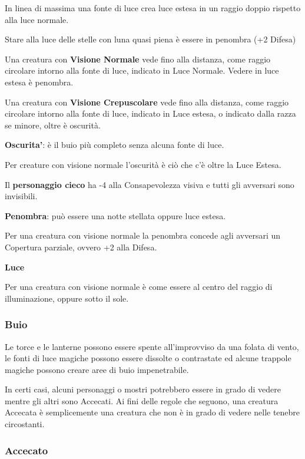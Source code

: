\documentclass[a4paper,11pt,twoside,openany]{book}
\begin{document}
\bigskip

In linea di massima una fonte di luce crea luce estesa in un raggio doppio rispetto alla luce normale.

Stare alla luce delle stelle con luna quasi piena è essere in penombra (+2 Difesa)

Una creatura con \textbf{Visione Normale} vede fino alla distanza, come raggio circolare intorno alla fonte di luce, indicato in Luce Normale. Vedere in luce estesa è penombra.

Una creatura con \textbf{Visione Crepuscolare} vede fino alla distanza, come raggio circolare intorno alla fonte di luce, indicato in Luce estesa, o indicato dalla razza se minore, oltre è oscurità.

\textbf{Oscurita'}: è il buio più completo senza alcuna fonte di luce.

Per creature con visione normale l'oscurità è ciò che c'è oltre la Luce Estesa.

Il \textbf{personaggio cieco} ha -4 alla Consapevolezza visiva e tutti gli avversari sono invisibili.

\textbf{Penombra}: può essere una notte stellata oppure luce estesa.

Per una creatura con visione normale la penombra concede agli avversari un Copertura parziale, ovvero +2 alla Difesa.

\textbf{Luce}

Per una creatura con visione normale è come essere al centro del raggio di illuminazione, oppure sotto il sole.

\subsubsection{Buio}

\label{buio}

Le torce e le lanterne possono essere spente all'improvviso da una folata di vento, le fonti di luce magiche possono essere dissolte o contrastate ed alcune trappole magiche possono creare aree di buio impenetrabile.

In certi casi, alcuni personaggi o mostri potrebbero essere in grado di vedere mentre gli altri sono Accecati. Ai fini delle regole che seguono, una creatura Accecata è semplicemente una creatura che non è in grado di vedere nelle tenebre circostanti.

\subsubsection{Accecato}
\end{document}
